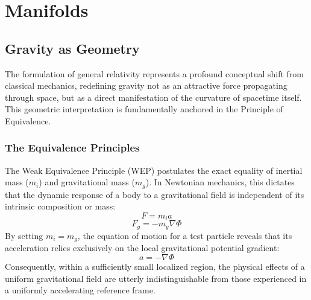 \documentclass[11pt, a4paper]{report}
\begin{document}
\chapter{Manifolds}

\section{Gravity as Geometry}
The formulation of general relativity represents a profound conceptual shift from classical mechanics, redefining gravity not as an attractive force propagating through space, but as a direct manifestation of the curvature of spacetime itself. This geometric interpretation is fundamentally anchored in the Principle of Equivalence.

\subsection*{The Equivalence Principles}
The Weak Equivalence Principle (WEP) postulates the exact equality of inertial mass ($m_i$) and gravitational mass ($m_g$). In Newtonian mechanics, this dictates that the dynamic response of a body to a gravitational field is independent of its intrinsic composition or mass:
\begin{equation} F = m_i a \end{equation}
\begin{equation} F_g = -m_g \nabla \Phi \end{equation}
By setting $m_i = m_g$, the equation of motion for a test particle reveals that its acceleration relies exclusively on the local gravitational potential gradient:
\begin{equation} a = -\nabla \Phi \end{equation}
Consequently, within a sufficiently small localized region, the physical effects of a uniform gravitational field are utterly indistinguishable from those experienced in a uniformly accelerating reference frame.
\end{document}
